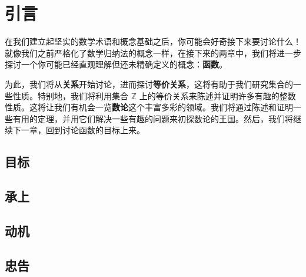 \section{引言}

在我们建立起坚实的数学术语和概念基础之后，你可能会好奇接下来要讨论什么！就像我们之前严格化了数学归纳法的概念一样，在接下来的两章中，我们将进一步探讨一个你可能已经直观理解但还未精确定义的概念：\textbf{函数}。

为此，我们将从\textbf{关系}开始讨论，进而探讨\textbf{等价关系}，这将有助于我们研究集合的一些性质。特别地，我们将利用集合 $\mathbb{Z}$ 上的等价关系来陈述并证明许多有趣的整数性质。这将让我们有机会一览\textbf{数论}这个丰富多彩的领域。我们将通过陈述和证明一些有用的定理，并用它们解决一些有趣的问题来初探数论的王国。然后，我们将继续下一章，回到讨论函数的目标上来。

\subsection{目标}

\subsection{承上}

\subsection{动机}

\subsection{忠告}